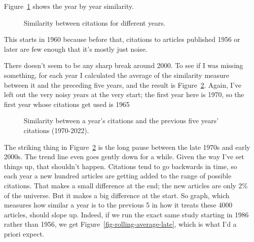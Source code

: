 \documentclass[
  10pt,
  letterpaper,
  DIV=11,
  numbers=noendperiod,
  twoside]{scrartcl}
\begin{document}
Figure~\ref{fig-matrix} shows the year by year similarity.

\begin{figure}


\caption{\label{fig-matrix}Similarity between citations for different
years.}

\end{figure}%

This starts in 1960 because before that, citations to articles published
1956 or later are few enough that it's mostly just noise.

There doesn't seem to be any sharp break around 2000. To see if I was
missing something, for each year I calculated the average of the
similarity measure between it and the preceding five years, and the
result is Figure~\ref{fig-rolling-average}. Again, I've left out the
very noisy years at the very start; the first year here is 1970, so the
first year whose citations get used is 1965

\begin{figure}


\caption{\label{fig-rolling-average}Similarity between a year's
citations and the previous five years' citations (1970-2022).}

\end{figure}%

The striking thing in Figure~\ref{fig-rolling-average} is the long pause
between the late 1970s and early 2000s. The trend line even goes gently
down for a while. Given the way I've set things up, that shouldn't
happen. Citations tend to go backwards in time, so each year a new
hundred articles are getting added to the range of possible citations.
That makes a small difference at the end; the new articles are only 2\%
of the universe. But it makes a big difference at the start. So graph,
which measures how similar a year is to the previous 5 in how it treats
these 4000 articles, should slope up. Indeed, if we run the exact same
study starting in 1986 rather than 1956, we get
Figure~\ref{fig-rolling-average-late}, which is what I'd a priori
expect.
\end{document}
